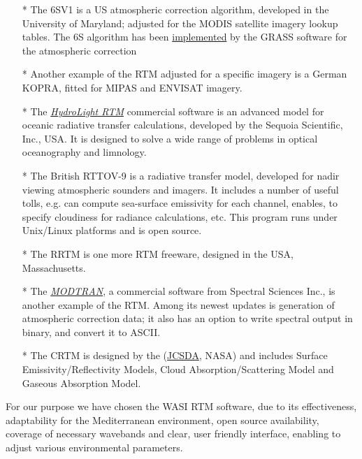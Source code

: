 \documentclass[11pt]{article}
\begin{document}
	\begin{itemize}
		\item [*] The \ac{6SV1}  is a US atmospheric correction algorithm, developed in the University of Maryland; adjusted for the \ac{MODIS} satellite imagery lookup tables. The 6S algorithm has been \href{http://grass.osgeo.org/grass64/manuals/html64_user/i.atcorr.html}{implemented} by the \ac{GRASS} software for the atmospheric correction 	 
		\item [*] Another example of the RTM adjusted for a specific imagery is a German \ac{KOPRA}, fitted for \ac{MIPAS} and \ac{ENVISAT} imagery.
		\item [*]  The \href{http://www.sequoiasci.com/products/Hydrolight.aspx}{\textit{HydroLight RTM}} commercial software is an advanced model for oceanic radiative transfer calculations, developed by the Sequoia Scientific, Inc., USA. It is designed to solve a wide range of problems in optical oceanography and limnology.   
		\item [*] The British \ac{RTTOV-9} is a radiative transfer model, developed for nadir viewing atmospheric sounders and imagers. It includes a number of useful tolls, e.g. can compute sea-surface emissivity for each channel, enables, to specify cloudiness for radiance calculations, etc.  This program runs under Unix/Linux platforms and is open source. 
		\item [*] The \ac{RRTM} is one more RTM freeware, designed in the USA, Massachusetts. 
		\item [*] The \href{http://www.modtran.org/}{\textit{MODTRAN}}, a commercial software from Spectral Sciences Inc., is another example of the RTM. Among its newest updates is generation of atmospheric correction data; it also has an option to write spectral output in binary, and convert it to \ac{ASCII}.
		\item [*] The \ac{CRTM}  is designed by the  (\href{http://www.jcsda.noaa.gov/}{JCSDA}, \ac{NASA}) and includes Surface Emissivity/Reflectivity Models, Cloud Absorption/Scattering Model and Gaseous Absorption Model.
	\end{itemize}
For our purpose we have chosen the \ac{WASI} \ac{RTM} software, due to its effectiveness, adaptability for the Mediterranean environment, open source availability, coverage of necessary wavebands and clear, user friendly interface, enabling to adjust various environmental parameters.
\end{document}
